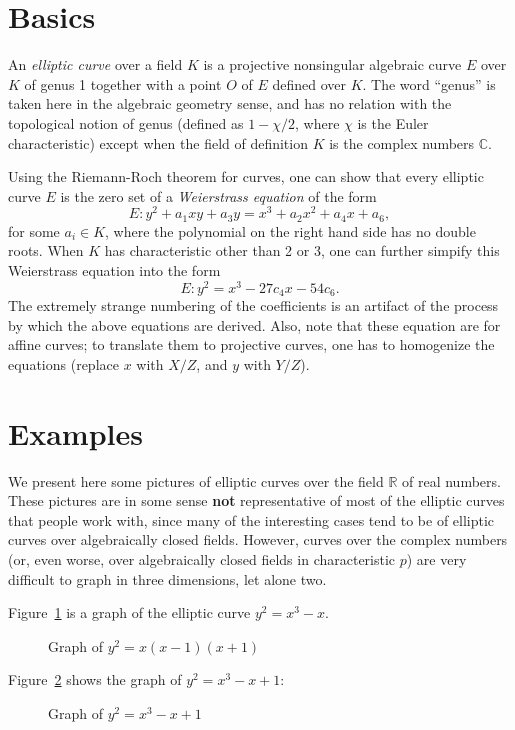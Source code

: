 \documentclass[12pt]{article}
\theoremstyle{definition}
\begin{document}
\section{Basics}
An {\em elliptic curve} over a field $K$ is a projective nonsingular algebraic curve $E$ over $K$ of genus 1 together with a point $O$ of $E$ defined over $K$. The word ``genus'' is taken here in the algebraic geometry sense, and has no relation with the topological notion of genus (defined as $1 - \chi/2$, where $\chi$ is the Euler characteristic) except when the field of definition $K$ is the complex numbers $\mathbb{C}$.

Using the Riemann-Roch theorem for curves, one can show that every elliptic curve $E$ is the zero set of a {\em Weierstrass equation} of the form
$$
E: y^2 + a_1 xy + a_3 y = x^3 + a_2 x^2 + a_4 x + a_6,
$$
for some $a_i \in K$, where the polynomial on the right hand side has no double roots. When $K$ has characteristic other than 2 or 3, one can further simpify this Weierstrass equation into the form
$$
E: y^2 = x^3 - 27 c_4 x - 54 c_6.
$$
The extremely strange numbering of the coefficients is an artifact of the process by which the above equations are derived. Also, note that these equation are for affine curves; to translate them to projective curves, one has to homogenize the equations (replace $x$ with $X/Z$, and $y$ with $Y/Z$).

\section{Examples}

We present here some pictures of elliptic curves over the field $\mathbb{R}$ of real numbers. These pictures are in some sense {\bf not} representative of most of the elliptic curves that people work with, since many of the interesting cases tend to be of elliptic curves over algebraically closed fields. However, curves over the complex numbers (or, even worse, over algebraically closed fields in characteristic $p$) are very difficult to graph in three dimensions, let alone two.

Figure~\ref{01-1} is a graph of the elliptic curve $y^2 = x^3 - x$.
\begin{figure}
\caption{Graph of $y^2 = x(x-1)(x+1)$}
\label{01-1}
\end{figure}

Figure~\ref{0-11} shows the graph of $y^2 = x^3 - x + 1$:
\begin{figure}
\caption{Graph of $y^2 = x^3 - x + 1$}
\label{0-11}
\end{figure}
\end{document}
